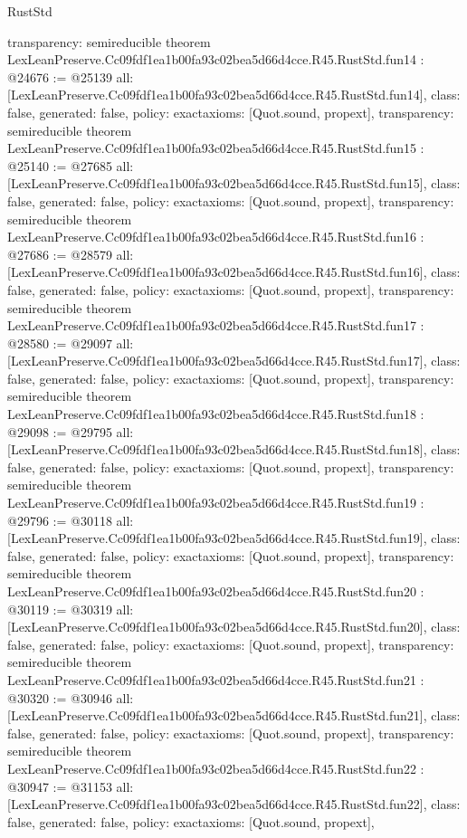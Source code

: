 \begin{lexlean}{RustStd}
\begin{coremodule}
{  transparency: semireducible
}
theorem LexLeanPreserve.Cc09fdf1ea1b00fa93c02bea5d66d4cce.R45.RustStd.fun14 : @24676 := @25139 {
  all: [LexLeanPreserve.Cc09fdf1ea1b00fa93c02bea5d66d4cce.R45.RustStd.fun14],
  class: false,
  generated: false,
  policy: exact{axioms: [Quot.sound, propext]},
  transparency: semireducible
}
theorem LexLeanPreserve.Cc09fdf1ea1b00fa93c02bea5d66d4cce.R45.RustStd.fun15 : @25140 := @27685 {
  all: [LexLeanPreserve.Cc09fdf1ea1b00fa93c02bea5d66d4cce.R45.RustStd.fun15],
  class: false,
  generated: false,
  policy: exact{axioms: [Quot.sound, propext]},
  transparency: semireducible
}
theorem LexLeanPreserve.Cc09fdf1ea1b00fa93c02bea5d66d4cce.R45.RustStd.fun16 : @27686 := @28579 {
  all: [LexLeanPreserve.Cc09fdf1ea1b00fa93c02bea5d66d4cce.R45.RustStd.fun16],
  class: false,
  generated: false,
  policy: exact{axioms: [Quot.sound, propext]},
  transparency: semireducible
}
theorem LexLeanPreserve.Cc09fdf1ea1b00fa93c02bea5d66d4cce.R45.RustStd.fun17 : @28580 := @29097 {
  all: [LexLeanPreserve.Cc09fdf1ea1b00fa93c02bea5d66d4cce.R45.RustStd.fun17],
  class: false,
  generated: false,
  policy: exact{axioms: [Quot.sound, propext]},
  transparency: semireducible
}
theorem LexLeanPreserve.Cc09fdf1ea1b00fa93c02bea5d66d4cce.R45.RustStd.fun18 : @29098 := @29795 {
  all: [LexLeanPreserve.Cc09fdf1ea1b00fa93c02bea5d66d4cce.R45.RustStd.fun18],
  class: false,
  generated: false,
  policy: exact{axioms: [Quot.sound, propext]},
  transparency: semireducible
}
theorem LexLeanPreserve.Cc09fdf1ea1b00fa93c02bea5d66d4cce.R45.RustStd.fun19 : @29796 := @30118 {
  all: [LexLeanPreserve.Cc09fdf1ea1b00fa93c02bea5d66d4cce.R45.RustStd.fun19],
  class: false,
  generated: false,
  policy: exact{axioms: [Quot.sound, propext]},
  transparency: semireducible
}
theorem LexLeanPreserve.Cc09fdf1ea1b00fa93c02bea5d66d4cce.R45.RustStd.fun20 : @30119 := @30319 {
  all: [LexLeanPreserve.Cc09fdf1ea1b00fa93c02bea5d66d4cce.R45.RustStd.fun20],
  class: false,
  generated: false,
  policy: exact{axioms: [Quot.sound, propext]},
  transparency: semireducible
}
theorem LexLeanPreserve.Cc09fdf1ea1b00fa93c02bea5d66d4cce.R45.RustStd.fun21 : @30320 := @30946 {
  all: [LexLeanPreserve.Cc09fdf1ea1b00fa93c02bea5d66d4cce.R45.RustStd.fun21],
  class: false,
  generated: false,
  policy: exact{axioms: [Quot.sound, propext]},
  transparency: semireducible
}
theorem LexLeanPreserve.Cc09fdf1ea1b00fa93c02bea5d66d4cce.R45.RustStd.fun22 : @30947 := @31153 {
  all: [LexLeanPreserve.Cc09fdf1ea1b00fa93c02bea5d66d4cce.R45.RustStd.fun22],
  class: false,
  generated: false,
  policy: exact{axioms: [Quot.sound, propext]},
}
\end{coremodule}
\end{lexlean}
